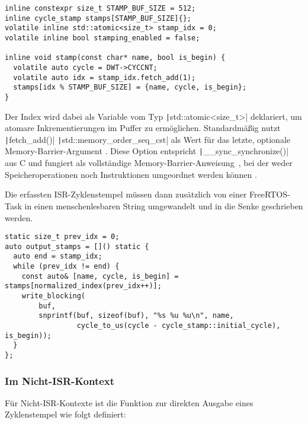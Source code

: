 \begin{code}
\begin{verbatim}
inline constexpr size_t STAMP_BUF_SIZE = 512;
inline cycle_stamp stamps[STAMP_BUF_SIZE]{};
volatile inline std::atomic<size_t> stamp_idx = 0;
volatile inline bool stamping_enabled = false;

inline void stamp(const char* name, bool is_begin) {
  volatile auto cycle = DWT->CYCCNT;
  volatile auto idx = stamp_idx.fetch_add(1);
  stamps[idx % STAMP_BUF_SIZE] = {name, cycle, is_begin};
}
\end{verbatim}
\end{code}

Der Index wird dabei als Variable vom Typ \texttt|std::atomic<size_t>|
deklariert, um atomare Inkrementierungen im Puffer zu ermöglichen. Standardmäßig
nutzt \texttt|fetch_add()| \texttt|std::memory_order_seq_cst|
als Wert für das letzte, optionale Memory-Barrier-Argument
\cite{cppreference_fetch_add}. Diese Option entspricht
\texttt|__sync_synchronize()| aus C und fungiert als vollständige
Memory-Barrier-Anweisung~\cite{cppreference_memory_order}, bei der weder
Speicheroperationen noch Instruktionen umgeordnet werden können
\cite{gnu_atomic_builtins}.

Die erfassten ISR-Zyklenstempel müssen dann zusätzlich von einer FreeRTOS-Task
in einen menschenlesbaren String umgewandelt und in die Senke geschrieben
werden.

\begin{code}
    \begin{verbatim}
static size_t prev_idx = 0;
auto output_stamps = []() static {
  auto end = stamp_idx;
  while (prev_idx != end) {
    const auto& [name, cycle, is_begin] = stamps[normalized_index(prev_idx++)];
    write_blocking(
        buf,
        snprintf(buf, sizeof(buf), "%s %u %u\n", name,
                 cycle_to_us(cycle - cycle_stamp::initial_cycle), is_begin));
  }
};
    \end{verbatim}
\end{code}

\subsubsection{Im Nicht-ISR-Kontext}

Für Nicht-ISR-Kontexte ist die Funktion zur direkten Ausgabe eines Zyklenstempel
wie folgt definiert:

